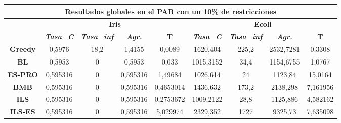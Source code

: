 \documentclass[12pt, spanish]{article}
\begin{document}
\begin{table}[H]
\begin{tabular}{|c|c|c|c|c|c|c|c|c|}
\hline
\multicolumn{9}{|c|}{\textbf{Resultados globales en el PAR con un 10\% de restricciones}}                                                                                                                      \\ \hline
\multicolumn{1}{|l|}{\multirow{2}{*}{}} & \multicolumn{4}{c|}{\textbf{Iris}}                                                            & \multicolumn{4}{c|}{\textbf{Ecoli}}                                                           \\ \cline{2-9} 
\multicolumn{1}{|l|}{}                  & \textit{\textbf{Tasa\_C}} & \textit{\textbf{Tasa\_inf}} & \textit{\textbf{Agr.}} & \textbf{T} & \textit{\textbf{Tasa\_C}} & \textit{\textbf{Tasa\_inf}} & \textit{\textbf{Agr.}} & \textbf{T} \\ \hline
\textbf{Greedy}                         & 0,5976                    & 18,2                        & 1,4155                 & 0,0089     & 1620,404                  & 225,2                       & 2532,7281              & 0,3308     \\ \hline
\textbf{BL}                             & 0,5953                    & 0                           & 0,5953                 & 0,033      & 1015,3152                 & 34,4                        & 1154,6755              & 1,0767     \\ \hline
\textbf{ES-PRO}                & 0,595316                  & 0                           & 0,595316               & 1,49684    & 1026,614                  & 24                          & 1123,84                & 15,0164    \\ \hline
\textbf{BMB}                            & 0,595316                  & 0                           & 0,595316               & 0,4653014  & 1436,632                  & 173,2                       & 2138,298               & 7,161956   \\ \hline
\textbf{ILS}                            & 0,595316                  & 0                           & 0,595316               & 0,2753672  & 1009,2122                 & 28,8                        & 1125,886               & 4,582162   \\ \hline
\textbf{ILS-ES}                         & 0,595316                  & 0                           & 0,595316               & 5,029974   & 2329,352                  & 1727                        & 9325,73                & 7,635098   \\ \hline
\end{tabular}
\end{table}
\end{document}
